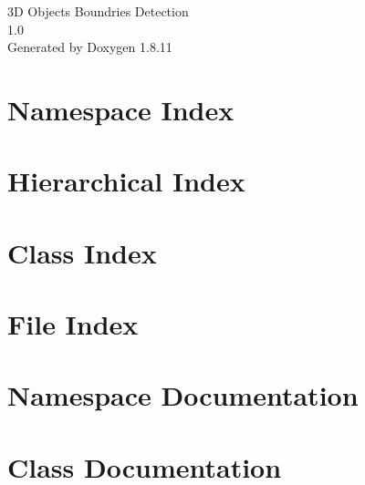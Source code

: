 \documentclass[twoside]{book}
\newcommand{\+}{\discretionary{\mbox{\scriptsize$\hookleftarrow$}}{}{}}
\newcommand{\clearemptydoublepage}{%
  \newpage{\pagestyle{empty}\cleardoublepage}%
}
\begin{document}
\hypersetup{pageanchor=false,
             bookmarksnumbered=true,
             pdfencoding=unicode
            }
\begin{titlepage}
\vspace*{7cm}
\begin{center}%
{\Large 3D Objects Boundries Detection \\[1ex]\large 1.\+0 }\\
\vspace*{1cm}
{\large Generated by Doxygen 1.8.11}\\
\end{center}
\end{titlepage}
\clearemptydoublepage
\tableofcontents
\clearemptydoublepage
{}
\hypersetup{pageanchor=true}

\chapter{Namespace Index}

\chapter{Hierarchical Index}

\chapter{Class Index}

\chapter{File Index}

\chapter{Namespace Documentation}







\chapter{Class Documentation}










\end{document}

